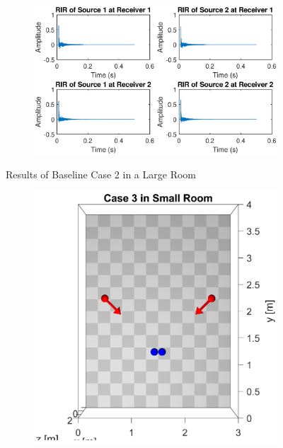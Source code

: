 \documentclass[a4paper,twoside,12pt,hidelinks]{article}
\begin{document}
\begin{appendices}
\begin{figure}[H]
\begin{subfigure}[H]{0.6\textwidth}
\includegraphics[width=\textwidth]{2l_ir}
\end{subfigure}
\caption{Results of Baseline Case 2 in a Large Room}
\end{figure}
\newpage
\begin{figure}[H]
\centering
\begin{subfigure}[H]{0.35\textwidth}
\includegraphics[width=\textwidth]{3s_lo}
\end{subfigure}
\begin{subfigure}[H]{0.6\textwidth}

\end{subfigure}
\end{figure}
\end{appendices}
\end{document}
